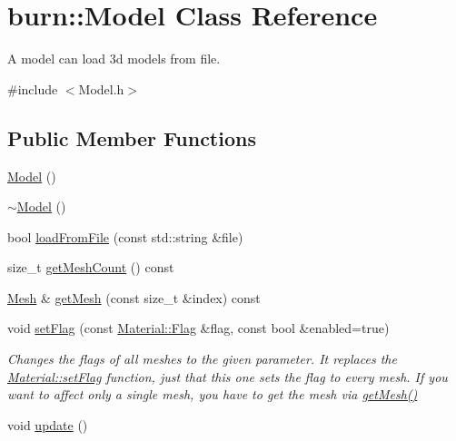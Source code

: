 \hypertarget{classburn_1_1_model}{\section{burn\-:\-:Model Class Reference}
\label{classburn_1_1_model}
}


A model can load 3d models from file.  




{\ttfamily \#include $<$Model.\-h$>$}

\subsection*{Public Member Functions}
\begin{DoxyCompactItemize}
\item 
\hyperlink{classburn_1_1_model_a5d34c9330e9bbbe558f435345f020c95}{Model} ()
\item 
\hyperlink{classburn_1_1_model_adbcc65acd88e11d79b890b984864d938}{$\sim$\-Model} ()
\item 
bool \hyperlink{classburn_1_1_model_aa9220fbb6658d0ded238efd5f5e81097}{load\-From\-File} (const std\-::string \&file)
\item 
size\-\_\-t \hyperlink{classburn_1_1_model_a25e8e13b43f76cb7336a8dafbebcbc44}{get\-Mesh\-Count} () const 
\item 
\hyperlink{classburn_1_1_mesh}{Mesh} \& \hyperlink{classburn_1_1_model_a08880f1dc5bc4b7d9e286275979efc39}{get\-Mesh} (const size\-\_\-t \&index) const 
\item 
void \hyperlink{classburn_1_1_model_ac685b9312e2fbc837142d66949c8056f}{set\-Flag} (const \hyperlink{classburn_1_1_material_a704108f8bb133e1911495b84bd0826b8}{Material\-::\-Flag} \&flag, const bool \&enabled=true)
\begin{DoxyCompactList}\small\item\em Changes the flags of all meshes to the given parameter. It replaces the \hyperlink{classburn_1_1_material_a833037afe81bc0aa52ceb4581b66087f}{Material\-::set\-Flag} function, just that this one sets the flag to every mesh. If you want to affect only a single mesh, you have to get the mesh via \hyperlink{classburn_1_1_model_a08880f1dc5bc4b7d9e286275979efc39}{get\-Mesh()} \end{DoxyCompactList}\item 
void \hyperlink{classburn_1_1_model_a9f9a12b843e91110ac500d23fd33a46c}{update} ()
\end{DoxyCompactItemize}


